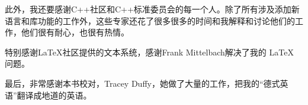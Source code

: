 此外，我还要感谢C++社区和C++标准委员会的每一个人。除了所有涉及添加新语言和库功能的工作外，这些专家还花了很多很多的时间和我解释和讨论他们的工作，他们很有耐心，也很有热情。\par

特别感谢LaTeX社区提供的文本系统，感谢Frank Mittelbach解决了我的 \LaTeX\xspace 问题。\par

最后，非常感谢本书校对，Tracey Duffy，她做了大量的工作，把我的“德式英语”翻译成地道的英语。\par

\newpage
















